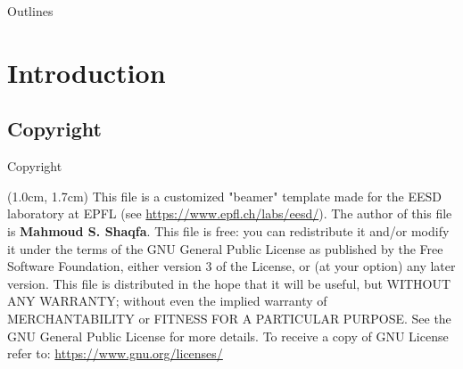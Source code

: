 \documentclass{EESD}
\begin{document}




\begin{frame}{Outlines}
\begin{multicols}{2}
\tableofcontents
\end{multicols}
\end{frame}

\section{Introduction}


\subsection{Copyright}
\begin{frame}[t]{Copyright}
\begin{textblock*}{13cm}(1.0cm,  1.7cm)
    {\selectfont
    This file is a customized "beamer" template made for the EESD laboratory at EPFL (see \href{https://www.epfl.ch/labs/eesd/}{https://www.epfl.ch/labs/eesd/}). The author of this file is \textbf{Mahmoud S. Shaqfa}. This file is free: you can redistribute it and/or modify it under the terms of the GNU General Public License as published by    the Free Software Foundation, either version 3 of the License, or (at your option) any later version. This file is distributed in the hope that it will be useful, but WITHOUT ANY WARRANTY; without even the implied warranty of MERCHANTABILITY or FITNESS FOR A PARTICULAR PURPOSE.  See the GNU General Public License for more details. To receive a copy of GNU License refer to: \href{https://www.gnu.org/licenses/}{https://www.gnu.org/licenses/}
    }
\end{textblock*}
\end{frame}
\end{document}

